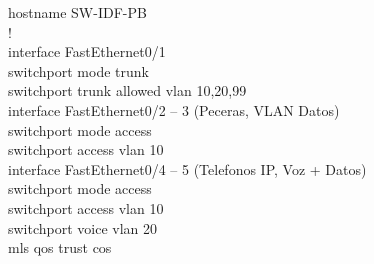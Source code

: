 \documentclass[11pt, letterpaper]{article}
\begin{document}
\begin{tcolorbox}[enhanced, breakable, colback=black!95, colframe=AzulUNAM,
                  title=\textbf{SW-IDF-PB -- Switch de Acceso IDF Planta Baja}, arc=2mm, boxrule=1pt,
                  attach boxed title to top left={xshift=5mm, yshift=-3mm},
                  boxed title style={colback=AzulUNAM},
                  fontupper=\ttfamily\small\color{white}]
hostname SW-IDF-PB\\
!\\
interface FastEthernet0/1\\
\hspace{1em}switchport mode trunk\\
\hspace{1em}switchport trunk allowed vlan 10,20,99\\
interface FastEthernet0/2 -- 3  (Peceras, VLAN Datos)\\
\hspace{1em}switchport mode access\\
\hspace{1em}switchport access vlan 10\\
interface FastEthernet0/4 -- 5  (Telefonos IP, Voz + Datos)\\
\hspace{1em}switchport mode access\\
\hspace{1em}switchport access vlan 10\\
\hspace{1em}switchport voice vlan 20\\
\hspace{1em}mls qos trust cos
\end{tcolorbox}
\end{document}
